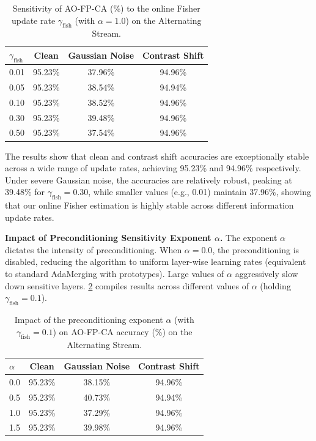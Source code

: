 \documentclass{article}
\theoremstyle{plain}
\theoremstyle{definition}
\begin{document}
\begin{table}[t]
\caption{Sensitivity of AO-FP-CA (\%) to the online Fisher update rate $\gamma_{\text{fish}}$ (with $\alpha = 1.0$) on the Alternating Stream.}
\label{tab:gamma_sweep}
\vskip 0.08in
\centering
\begin{small}
\begin{sc}
\begin{tabular}{lccc}
\toprule
$\gamma_{\text{fish}}$ & Clean & Gaussian Noise & Contrast Shift \\
\midrule
0.01 & 95.23\% & 37.96\% & 94.96\% \\
0.05 & 95.23\% & 38.54\% & 94.94\% \\
0.10 & 95.23\% & 38.52\% & 94.96\% \\
0.30 & 95.23\% & 39.48\% & 94.96\% \\
0.50 & 95.23\% & 37.54\% & 94.96\% \\
\bottomrule
\end{tabular}
\end{sc}
\end{small}
\vskip -0.1in
\end{table}

The results show that clean and contrast shift accuracies are exceptionally stable across a wide range of update rates, achieving 95.23\% and 94.96\% respectively. Under severe Gaussian noise, the accuracies are relatively robust, peaking at 39.48\% for $\gamma_{\text{fish}} = 0.30$, while smaller values (e.g., 0.01) maintain 37.96\%, showing that our online Fisher estimation is highly stable across different information update rates.

\textbf{Impact of Preconditioning Sensitivity Exponent $\alpha$.}
The exponent $\alpha$ dictates the intensity of preconditioning. When $\alpha = 0.0$, the preconditioning is disabled, reducing the algorithm to uniform layer-wise learning rates (equivalent to standard AdaMerging with prototypes). Large values of $\alpha$ aggressively slow down sensitive layers. \cref{tab:alpha_sweep} compiles results across different values of $\alpha$ (holding $\gamma_{\text{fish}} = 0.1$).

\begin{table}[t]
\caption{Impact of the preconditioning exponent $\alpha$ (with $\gamma_{\text{fish}} = 0.1$) on AO-FP-CA accuracy (\%) on the Alternating Stream.}
\label{tab:alpha_sweep}
\vskip 0.08in
\centering
\begin{small}
\begin{sc}
\begin{tabular}{lccc}
\toprule
$\alpha$ & Clean & Gaussian Noise & Contrast Shift \\
\midrule
0.0 & 95.23\% & 38.15\% & 94.96\% \\
0.5 & 95.23\% & 40.73\% & 94.94\% \\
1.0 & 95.23\% & 37.29\% & 94.96\% \\
1.5 & 95.23\% & 39.98\% & 94.96\% \\
\bottomrule
\end{tabular}
\end{sc}
\end{small}
\vskip -0.1in
\end{table}
\end{document}
